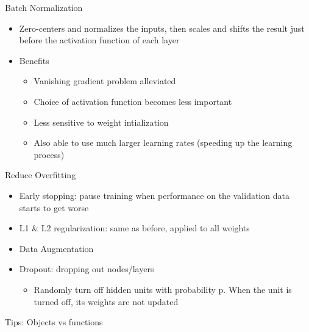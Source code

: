 \documentclass[10pt, oneside]{article}
\begin{document}
Batch Normalization
\begin{itemize}
    \item Zero-centers and normalizes the inputs, then scales and shifts the result just before the activation function of each layer
    \item Benefits
    \begin{itemize}
        \item Vanishing gradient problem alleviated
        \item Choice of activation function becomes less important
        \item Less sensitive to weight intialization
        \item Also able to use much larger learning rates (speeding up the learning process)
    \end{itemize}
\end{itemize}
Reduce Overfitting
\begin{itemize}
    \item Early stopping: pause training when performance on the validation data starts to get worse
    \item L1 \& L2 regularization: same as before, applied to all weights
    \item Data Augmentation
    \item Dropout: dropping out nodes/layers
    \begin{itemize}
        \item Randomly turn off hidden units with probability p. When the unit is turned off, its weights are not updated
    \end{itemize}
\end{itemize}
Tips: Objects vs functions
\end{document}
